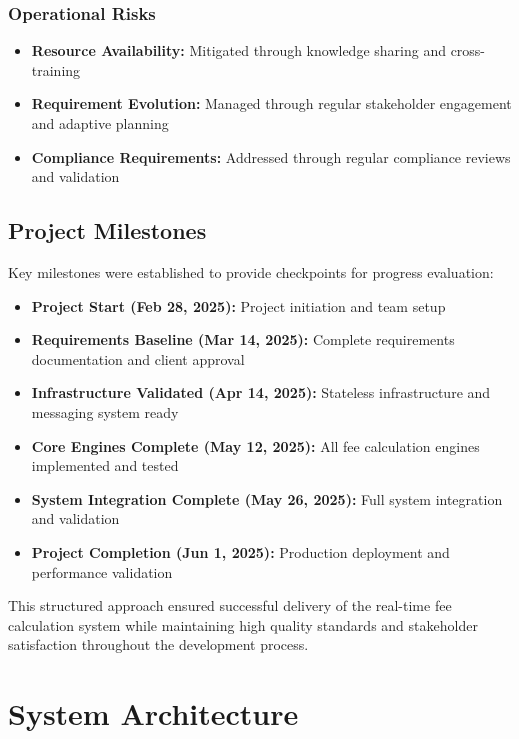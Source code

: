 \subsubsection{Operational Risks}

\begin{itemize}
    \item \textbf{Resource Availability:} Mitigated through knowledge sharing and cross-training
    \item \textbf{Requirement Evolution:} Managed through regular stakeholder engagement and adaptive planning
    \item \textbf{Compliance Requirements:} Addressed through regular compliance reviews and validation
\end{itemize}

\subsection{Project Milestones}

Key milestones were established to provide checkpoints for progress evaluation:

\begin{itemize}
    \item \textbf{Project Start (Feb 28, 2025):} Project initiation and team setup
    \item \textbf{Requirements Baseline (Mar 14, 2025):} Complete requirements documentation and client approval
    \item \textbf{Infrastructure Validated (Apr 14, 2025):} Stateless infrastructure and messaging system ready
    \item \textbf{Core Engines Complete (May 12, 2025):} All fee calculation engines implemented and tested
    \item \textbf{System Integration Complete (May 26, 2025):} Full system integration and validation
    \item \textbf{Project Completion (Jun 1, 2025):} Production deployment and performance validation
\end{itemize}

This structured approach ensured successful delivery of the real-time fee calculation system while maintaining high quality standards and stakeholder satisfaction throughout the development process.

\section{System Architecture}

